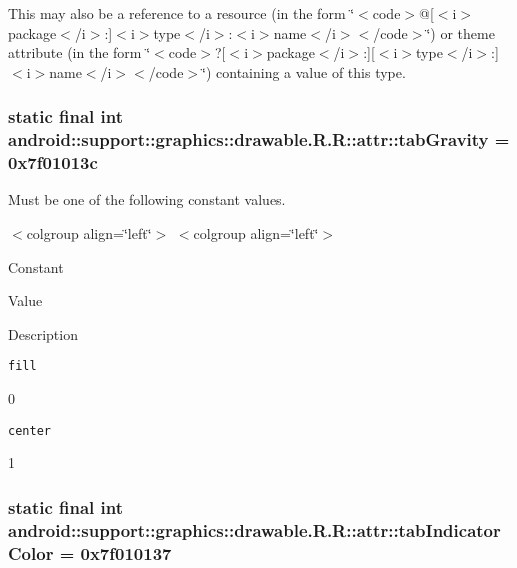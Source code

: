 This may also be a reference to a resource (in the form \char`\"{}$<$code$>$@\mbox{[}$<$i$>$package$<$/i$>$:\mbox{]}$<$i$>$type$<$/i$>$:$<$i$>$name$<$/i$>$$<$/code$>$\char`\"{}) or theme attribute (in the form \char`\"{}$<$code$>$?\mbox{[}$<$i$>$package$<$/i$>$:\mbox{]}\mbox{[}$<$i$>$type$<$/i$>$:\mbox{]}$<$i$>$name$<$/i$>$$<$/code$>$\char`\"{}) containing a value of this type. \hypertarget{classandroid_1_1support_1_1graphics_1_1drawable_1_1_r_1_1attr_053a2902102ae41a288d60b9afb56ed3}{
\subsubsection[{tabGravity}]{\setlength{\rightskip}{0pt plus 5cm}static final int android::support::graphics::drawable.R.R::attr::tabGravity = 0x7f01013c}}
\label{classandroid_1_1support_1_1graphics_1_1drawable_1_1_r_1_1attr_053a2902102ae41a288d60b9afb56ed3}


Must be one of the following constant values. \begin{TabularC}{0}
\hline
\end{TabularC}
$<$colgroup align=\char`\"{}left\char`\"{}$>$ $<$colgroup align=\char`\"{}left\char`\"{}$>$ 

Constant

Value

Description 

{\tt fill}

0

{\tt center}

1\hypertarget{classandroid_1_1support_1_1graphics_1_1drawable_1_1_r_1_1attr_7a34b35bb03e0fda91267d9c093db679}{
\subsubsection[{tabIndicatorColor}]{\setlength{\rightskip}{0pt plus 5cm}static final int android::support::graphics::drawable.R.R::attr::tabIndicatorColor = 0x7f010137}}
\label{classandroid_1_1support_1_1graphics_1_1drawable_1_1_r_1_1attr_7a34b35bb03e0fda91267d9c093db679}


